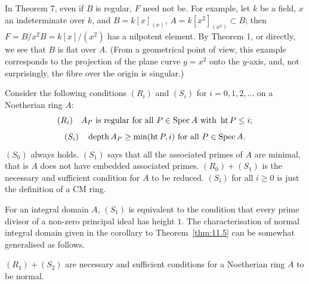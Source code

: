 \begin{remark}
In Theorem 7, even if $B$ is regular, $F$ need not be. For example, let $k$ be a
field, $x$ an indeterminate over $k$, and $B = k[x]_{(x)}$, $A = k[x^2]_{(x^2)}
\subset B$; then $F = B/x^2B = k[x]/(x^2)$ has a nilpotent element. By Theorem 1,
or directly, we see that $B$ is flat over $A$. (From a geometrical point of view,
this example corresponds to the projection of the plane curve $y = x^2$ onto the
$y$-axis, and, not surprisingly, the fibre over the origin is singular.)
\end{remark}

Consider the following conditions $(R_i)$ and $(S_i)$ for $i = 0, 1, 2, \ldots$ on a
Noetherian ring $A$:
\[
  (R_i) \quad A_P \text{ is regular for all } P \in \operatorname{Spec} A \text{ with } \operatorname{ht} P \le i;
\]
\[
  (S_i) \quad \operatorname{depth} A_P \ge \min(\operatorname{ht} P, i) \text{ for all } P \in \operatorname{Spec} A.
\]
$(S_0)$ always holds. $(S_1)$ says that all the associated primes of $A$ are minimal,
that is $A$ does not have embedded associated primes. $(R_0) + (S_1)$ is the
necessary and sufficient condition for $A$ to be reduced. $(S_i)$ for all $i \ge 0$
is just the definition of a CM ring.

For an integral domain $A$, $(S_1)$ is equivalent to the condition that every prime
divisor of a non-zero principal ideal has height $1$. The characterisation of
normal integral domain given in the corollary to Theorem~\ref{thm:11.5} can be
somewhat generalised as follows.

\begin{theorem}[Serre]\label{thm:23.8}
$(R_1) + (S_2)$ are necessary and sufficient conditions for a Noetherian ring $A$ to
be normal.
\end{theorem}

